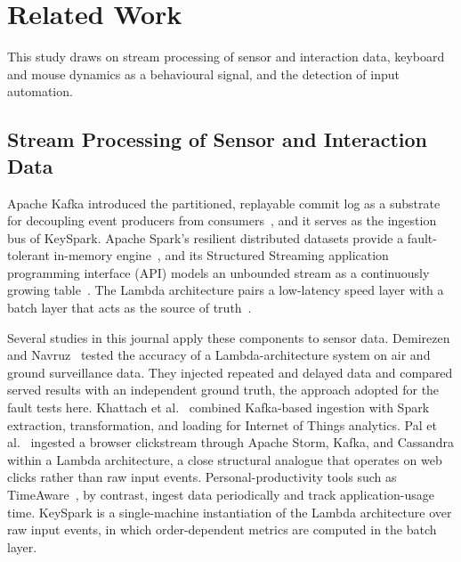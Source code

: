 \documentclass[sensors,article,submit,pdftex,oneauthor]{Definitions/mdpi}
\begin{document}
\section{Related Work}
\label{sec:related}

This study draws on stream processing of sensor and interaction data, keyboard and mouse dynamics as a behavioural signal, and the detection of input automation.

\subsection{Stream Processing of Sensor and Interaction Data}
Apache Kafka introduced the partitioned, replayable commit log as a substrate for decoupling event producers from consumers~\cite{kreps2011kafka}, and it serves as the ingestion bus of KeySpark. Apache Spark's resilient distributed datasets provide a fault-tolerant in-memory engine~\cite{zaharia2012rdd}, and its Structured Streaming application programming interface (API) models an unbounded stream as a continuously growing table~\cite{armbrust2018structured}. The Lambda architecture pairs a low-latency speed layer with a batch layer that acts as the source of truth~\cite{marz2015bigdata}.

Several studies in this journal apply these components to sensor data. Demirezen and Navruz~\cite{demirezen2023lambda} tested the accuracy of a Lambda-architecture system on air and ground surveillance data. They injected repeated and delayed data and compared served results with an independent ground truth, the approach adopted for the fault tests here. Khattach et al.~\cite{khattach2025iot} combined Kafka-based ingestion with Spark extraction, transformation, and loading for Internet of Things analytics. Pal et al.~\cite{pal2023clickstream} ingested a browser clickstream through Apache Storm, Kafka, and Cassandra within a Lambda architecture, a close structural analogue that operates on web clicks rather than raw input events. Personal-productivity tools such as TimeAware~\cite{kim2016timeaware}, by contrast, ingest data periodically and track application-usage time. KeySpark is a single-machine instantiation of the Lambda architecture over raw input events, in which order-dependent metrics are computed in the batch layer.
\end{document}
